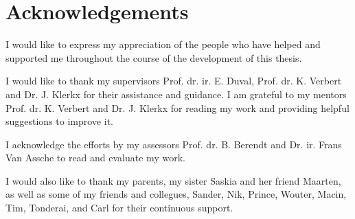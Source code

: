 \chapter*{Acknowledgements}


I would like to express my appreciation of the people who have helped and supported me throughout the course of the development of this thesis.

I would like to thank my supervisors Prof. dr. ir. E. Duval, Prof. dr. K. Verbert and Dr. J. Klerkx for their assistance and guidance. I am grateful to my mentors Prof. dr. K. Verbert and Dr. J. Klerkx for reading my work and providing helpful suggestions to improve it.

I acknowledge the efforts by my assessors Prof. dr. B. Berendt and Dr. ir. Frans Van Assche to read and evaluate my work.

I would also like to thank my parents, my sister Saskia and her friend Maarten, as well as some of my friends and collegues, Sander, Nik, Prince, Wouter, Macin, Tim, Tonderai, and Carl for their continuous support.
